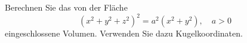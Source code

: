 \begin{atiTask}[
  title = Volumenberechnung I,
]
 Berechnen Sie das von der Fläche
 \begin{equation*}
(x^2+y^2+z^2)^2=a^2(x^2+y^2), \quad a>0
 \end{equation*}
eingeschlossene Volumen. Verwenden Sie dazu Kugelkoordinaten.

\end{atiTask}
